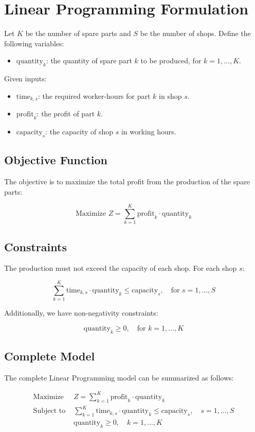 \documentclass{article}
\begin{document}
\section*{Linear Programming Formulation}

Let \( K \) be the number of spare parts and \( S \) be the number of shops. Define the following variables:

\begin{itemize}
    \item \( \text{quantity}_{k} \): the quantity of spare part \( k \) to be produced, for \( k = 1, \ldots, K \).
\end{itemize}

Given inputs:

\begin{itemize}
    \item \( \text{time}_{k,s} \): the required worker-hours for part \( k \) in shop \( s \).
    \item \( \text{profit}_{k} \): the profit of part \( k \).
    \item \( \text{capacity}_{s} \): the capacity of shop \( s \) in working hours.
\end{itemize}

\subsection*{Objective Function}

The objective is to maximize the total profit from the production of the spare parts:

\[
\text{Maximize } Z = \sum_{k=1}^{K} \text{profit}_{k} \cdot \text{quantity}_{k}
\]

\subsection*{Constraints}

The production must not exceed the capacity of each shop. For each shop \( s \):

\[
\sum_{k=1}^{K} \text{time}_{k,s} \cdot \text{quantity}_{k} \leq \text{capacity}_{s}, \quad \text{for } s = 1, \ldots, S
\]

Additionally, we have non-negativity constraints:

\[
\text{quantity}_{k} \geq 0, \quad \text{for } k = 1, \ldots, K
\]

\subsection*{Complete Model}

The complete Linear Programming model can be summarized as follows:

\begin{align*}
\text{Maximize } & Z = \sum_{k=1}^{K} \text{profit}_{k} \cdot \text{quantity}_{k} \\
\text{Subject to } & \sum_{k=1}^{K} \text{time}_{k,s} \cdot \text{quantity}_{k} \leq \text{capacity}_{s}, \quad s = 1, \ldots, S \\
& \text{quantity}_{k} \geq 0, \quad k = 1, \ldots, K
\end{align*}
\end{document}
